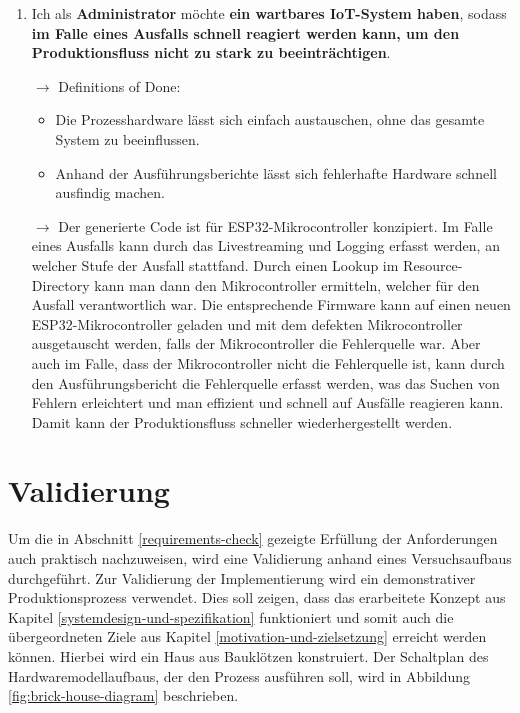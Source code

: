 \begin{enumerate}
    $\to$ Dieser Punkt konnte nicht implementiert werden, jedoch kann man bei dem Client-Socket des Livestreamings der Ausführung die Möglichkeit einbinden,
    die Live-Daten an den Kunden zu übermitteln, sodass dieser auch über den aktuellen Stand der Produktion informiert ist.
    
    \item Ich als \textbf{Administrator} möchte \textbf{ein wartbares IoT-System haben}, sodass \textbf{im Falle eines Ausfalls schnell reagiert
    werden kann, um den Produktionsfluss nicht zu stark zu beeinträchtigen}.

    \newpage
    $\to$ Definitions of Done:

    \begin{itemize}
        \item Die Prozesshardware lässt sich einfach austauschen, ohne das gesamte System zu beeinflussen.
        \item Anhand der Ausführungsberichte lässt sich fehlerhafte Hardware schnell ausfindig machen.
    \end{itemize}

    $\to$ Der generierte Code ist für ESP32-Mikrocontroller konzipiert. Im Falle eines Ausfalls kann durch das Livestreaming und Logging erfasst werden, an welcher 
    Stufe der Ausfall stattfand. Durch einen Lookup im Resource-Directory kann man dann den Mikrocontroller ermitteln, welcher für den Ausfall verantwortlich war. 
    Die entsprechende Firmware kann auf einen neuen ESP32-Mikrocontroller geladen und mit dem defekten Mikrocontroller ausgetauscht werden, falls der Mikrocontroller 
    die Fehlerquelle war. Aber auch im Falle, dass der Mikrocontroller nicht die Fehlerquelle ist, kann durch den Ausführungsbericht die Fehlerquelle erfasst werden, was das Suchen von Fehlern 
    erleichtert und man effizient und schnell auf Ausfälle reagieren kann. Damit kann der Produktionsfluss schneller wiederhergestellt werden.
\end{enumerate}

\section{Validierung}

Um die in Abschnitt \ref{requirements-check} gezeigte Erfüllung der Anforderungen auch praktisch nachzuweisen, wird eine Validierung anhand eines Versuchsaufbaus durchgeführt. Zur Validierung der Implementierung wird ein demonstrativer Produktionsprozess verwendet. Dies soll zeigen, dass das erarbeitete Konzept aus Kapitel \ref{systemdesign-und-spezifikation} funktioniert und somit auch die übergeordneten Ziele aus Kapitel \ref{motivation-und-zielsetzung} erreicht werden können. Hierbei wird ein Haus aus Bauklötzen konstruiert. 
Der Schaltplan des Hardwaremodellaufbaus, der den Prozess ausführen soll, wird in Abbildung \ref{fig:brick-house-diagram} beschrieben.

